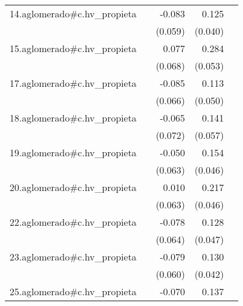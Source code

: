 {\begin{longtable}{l*{4}{D{.}{.}{-1}}}
\addlinespace
14.aglomerado#c.hv\_propieta&                     &      -0.083         &       0.125\sym{**} &                     \\
            &                     &     (0.059)         &     (0.040)         &                     \\
\addlinespace
15.aglomerado#c.hv\_propieta&                     &       0.077         &       0.284\sym{***}&                     \\
            &                     &     (0.068)         &     (0.053)         &                     \\
\addlinespace
17.aglomerado#c.hv\_propieta&                     &      -0.085         &       0.113\sym{*}  &                     \\
            &                     &     (0.066)         &     (0.050)         &                     \\
\addlinespace
18.aglomerado#c.hv\_propieta&                     &      -0.065         &       0.141\sym{*}  &                     \\
            &                     &     (0.072)         &     (0.057)         &                     \\
\addlinespace
19.aglomerado#c.hv\_propieta&                     &      -0.050         &       0.154\sym{***}&                     \\
            &                     &     (0.063)         &     (0.046)         &                     \\
\addlinespace
20.aglomerado#c.hv\_propieta&                     &       0.010         &       0.217\sym{***}&                     \\
            &                     &     (0.063)         &     (0.046)         &                     \\
\addlinespace
22.aglomerado#c.hv\_propieta&                     &      -0.078         &       0.128\sym{**} &                     \\
            &                     &     (0.064)         &     (0.047)         &                     \\
\addlinespace
23.aglomerado#c.hv\_propieta&                     &      -0.079         &       0.130\sym{**} &                     \\
            &                     &     (0.060)         &     (0.042)         &                     \\
\addlinespace
25.aglomerado#c.hv\_propieta&                     &      -0.070         &       0.137\sym{**} &                     \\

\end{longtable}}
